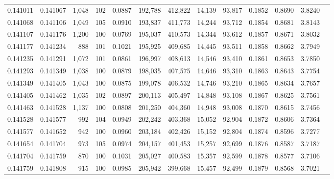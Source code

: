 \begin{tabular}{rrrrrrrrrrrrr}
0.141011 & 0.141067 & 1,048 & 102 &                                     0.0887 & 192,788 & 412,822 &  14,139 &  93,817 & 0.1852 & 0.8690 & 3.8240 \\
0.141068 & 0.141106 & 1,049 & 105 &                                     0.0910 & 193,837 & 411,773 &  14,244 &  93,712 & 0.1854 & 0.8681 & 3.8143 \\
0.141107 & 0.141176 & 1,200 & 100 &                                     0.0769 & 195,037 & 410,573 &  14,344 &  93,612 & 0.1857 & 0.8671 & 3.8032 \\
0.141177 & 0.141234 &   888 & 101 &                                     0.1021 & 195,925 & 409,685 &  14,445 &  93,511 & 0.1858 & 0.8662 & 3.7949 \\
0.141235 & 0.141291 & 1,072 & 101 &                                     0.0861 & 196,997 & 408,613 &  14,546 &  93,410 & 0.1861 & 0.8653 & 3.7850 \\
0.141293 & 0.141349 & 1,038 & 100 &                                     0.0879 & 198,035 & 407,575 &  14,646 &  93,310 & 0.1863 & 0.8643 & 3.7754 \\
0.141349 & 0.141405 & 1,043 & 100 &                                     0.0875 & 199,078 & 406,532 &  14,746 &  93,210 & 0.1865 & 0.8634 & 3.7657 \\
0.141405 & 0.141462 & 1,035 & 102 &                                     0.0897 & 200,113 & 405,497 &  14,848 &  93,108 & 0.1867 & 0.8625 & 3.7561 \\
0.141463 & 0.141528 & 1,137 & 100 &                                     0.0808 & 201,250 & 404,360 &  14,948 &  93,008 & 0.1870 & 0.8615 & 3.7456 \\
0.141528 & 0.141577 &   992 & 104 &                                     0.0949 & 202,242 & 403,368 &  15,052 &  92,904 & 0.1872 & 0.8606 & 3.7364 \\
0.141577 & 0.141652 &   942 & 100 &                                     0.0960 & 203,184 & 402,426 &  15,152 &  92,804 & 0.1874 & 0.8596 & 3.7277 \\
0.141654 & 0.141704 &   973 & 105 &                                     0.0974 & 204,157 & 401,453 &  15,257 &  92,699 & 0.1876 & 0.8587 & 3.7187 \\
0.141704 & 0.141759 &   870 & 100 &                                     0.1031 & 205,027 & 400,583 &  15,357 &  92,599 & 0.1878 & 0.8577 & 3.7106 \\
0.141759 & 0.141808 &   915 & 100 &                                     0.0985 & 205,942 & 399,668 &  15,457 &  92,499 & 0.1879 & 0.8568 & 3.7021 \\

\end{tabular}
